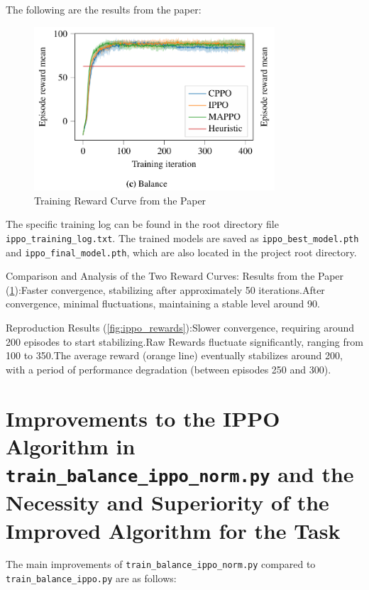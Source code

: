 \documentclass[12pt]{article}
\begin{document}
The following are the results from the paper:

\begin{figure}[H]
    \centering
    \includegraphics[width=0.8\textwidth]{training_rewards.png}
    \caption{Training Reward Curve from the Paper}
    \label{fig:paper_rewards}
\end{figure}

The specific training log can be found in the root directory file \texttt{ippo\_training\_log.txt}. The trained models are saved as \texttt{ippo\_best\_model.pth} and \texttt{ippo\_final\_model.pth}, which are also located in the project root directory.

Comparison and Analysis of the Two Reward Curves:
Results from the Paper (\ref{fig:paper_rewards}):Faster convergence, stabilizing after approximately 50 iterations.After convergence, minimal fluctuations, maintaining a stable level around 90.

Reproduction Results (\ref{fig:ippo_rewards}):Slower convergence, requiring around 200 episodes to start stabilizing.Raw Rewards fluctuate significantly, ranging from 100 to 350.The average reward (orange line) eventually stabilizes around 200, with a period of performance degradation (between episodes 250 and 300).



\section{Improvements to the IPPO Algorithm in \texttt{train\_balance\_ippo\_norm.py} and the Necessity and Superiority of the Improved Algorithm for the Task}

The main improvements of \texttt{train\_balance\_ippo\_norm.py} compared to \texttt{train\_balance\_ippo.py} are as follows:
\end{document}
